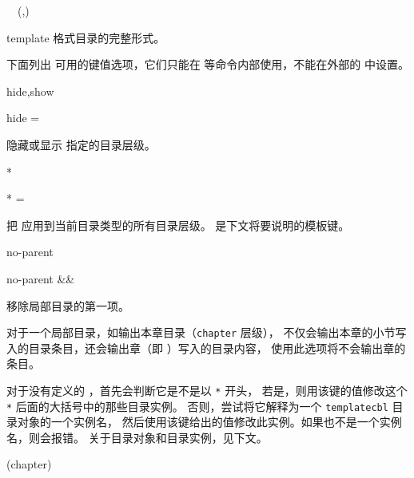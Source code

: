 \documentclass{cusdoc}
\begin{document}
\begin{function}{\templatecombinedlist}
  \begin{syntax}
    \V\templatecombinedlist {} 
    \V\templatecombinedlist {}   
    ~~\string(,\string) 
  \end{syntax}
template 格式目录的完整形式。
\end{function}

下面列出  可用的键值选项，它们只能在 
 等命令内部使用，不能在外部的  中设置。

\begin{keyval}[path=templatecbl]{hide,show}
  \begin{syntax}
    hide = 
  \end{syntax}
隐藏或显示  指定的目录层级。
\end{keyval}

\begin{keyval}[path=templatecbl]{*}
  \begin{syntax}
    * = 
  \end{syntax}
把  应用到当前目录类型的所有目录层级。
 是下文将要说明的模板键。
\end{keyval}

\begin{keyval}[path=templatecbl]{no-parent}
  \begin{syntax}
    no-parent &&
  \end{syntax}
移除局部目录的第一项。

对于一个局部目录，如输出本章目录（\texttt{chapter} 层级），
不仅会输出本章的小节写入的目录条目，还会输出章（即 ）写入的目录内容，
使用此选项将不会输出章的条目。
\end{keyval}

对于没有定义的 ，首先会判断它是不是以 \texttt{*} 开头，
若是，则用该键的值修改这个 \texttt{*} 后面的大括号中的那些目录实例。
否则，尝试将它解释为一个 \texttt{templatecbl} 目录对象的一个实例名，
然后使用该键给出的值修改此实例。如果也不是一个实例名，则会报错。
关于目录对象和目录实例，见下文。

\begin{xample}
\renewcommand\contentsname{} %
\templatetoc[no-parent,*{subsection}={ignore=true},
  section={ignore=false}](chapter) %
\stopxamplecode
\xampleprint
\end{xample}
\end{document}
